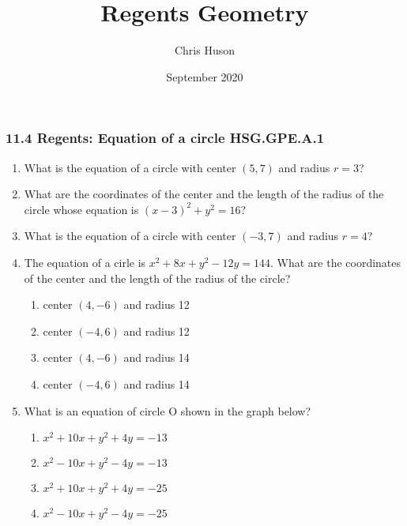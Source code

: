 \documentclass[12pt, twoside]{article}
\title{Regents Geometry}
\author{Chris Huson}
\date{September 2020}
\begin{document}
\subsubsection*{11.4 Regents: Equation of a circle \hfill HSG.GPE.A.1}
\begin{enumerate}
\item What is the equation of a circle with center $(5,7)$ and radius $r=3$? \vspace{1cm}

\item What are the coordinates of the center and the length of the radius of the circle whose equation is $(x-3)^2+y^2=16$? \vspace{1cm}

\item What is the equation of a circle with center $(-3,7)$ and radius $r=4$?\vspace{1cm}
  
\item %
  The equation of a cirle is $x^2+8x+y^2-12y=144$. What are the coordinates of the center and the length of the radius of the circle?
    \begin{enumerate}
      \item center $(4,-6)$ and radius 12
      \item center $(-4,6)$ and radius 12
      \item center $(4,-6)$ and radius 14
      \item center $(-4,6)$ and radius 14
    \end{enumerate}

\item %
  What is an equation of circle O shown in the graph below?
  \begin{center}
  \end{center}
  \begin{multicols}{2}
    \begin{enumerate}
      \item $x^2+10x+y^2+4y=-13$
      \item $x^2-10x+y^2-4y=-13$
      \item $x^2+10x+y^2+4y=-25$
      \item $x^2-10x+y^2-4y=-25$
    \end{enumerate}
  \end{multicols}


\end{enumerate}
\end{document}
